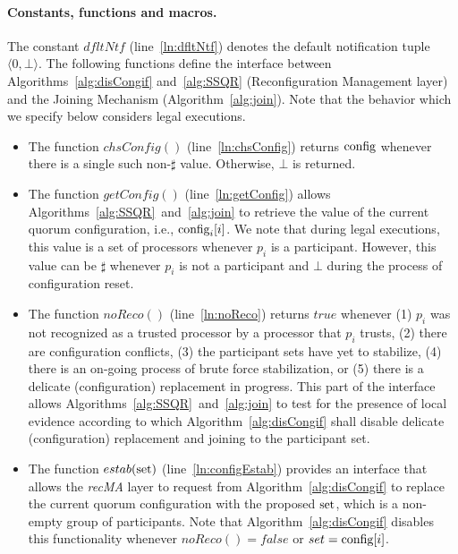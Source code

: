\documentclass[11pt]{article}
\newcommand{\noReconfig}{noReco}
\newcommand{\configEstab}{estab}
\begin{document}
\paragraph{Constants, functions and macros.}
The constant $dfltNtf$ (line~\ref{ln:dfltNtf}) denotes the default notification tuple $\langle 0,  \bot \rangle$.
The following functions define the interface between Algorithms~\ref{alg:disCongif} and~\ref{alg:SSQR} (Reconfiguration Management layer) and the Joining Mechanism (Algorithm~\ref{alg:join}). Note that the behavior which we specify below considers legal executions.  

\begin{itemize}

\item The function $chsConfig()$ (line~\ref{ln:chsConfig}) returns $\textnormal{config}$ whenever there is a single such non-$\sharp$ value. Otherwise, $\bot$ is returned.

\item The function $getConfig()$ (line~\ref{ln:getConfig}) allows Algorithms~\ref{alg:SSQR}~and~\ref{alg:join} to retrieve the value of the current quorum configuration, i.e., $\textnormal{config}_i[i]$. We note that during legal executions, this value is a set of processors whenever $p_i$ is a participant. However, this value can be $\sharp$ whenever $p_i$ is not a participant and $\bot$ during the process of configuration reset.

\item The function $\noReconfig()$ (line~\ref{ln:\noReconfig}) returns $true$ whenever (1) $p_i$ was not recognized as a trusted processor by a processor that $p_i$ trusts, (2) there are configuration conflicts, (3) the participant sets have yet to stabilize, (4) there is an on-going process of brute force stabilization, or (5) there is a delicate (configuration) replacement in progress. This part of the interface allows Algorithms~\ref{alg:SSQR}~and~\ref{alg:join} to test for the presence of local evidence according to which Algorithm~\ref{alg:disCongif} shall disable delicate (configuration) replacement and joining to the participant set.


\item The function $\configEstab(\textnormal{set})$ (line~\ref{ln:configEstab}) provides an interface that allows the \emph{recMA} layer to request from Algorithm~\ref{alg:disCongif} to replace the current quorum configuration with the proposed $\textnormal{set}$, which is a non-empty group of participants. Note that Algorithm~\ref{alg:disCongif} disables this functionality whenever $\noReconfig()=false$ or $set = \textnormal{config}[i]$.



\end{itemize}
\end{document}
